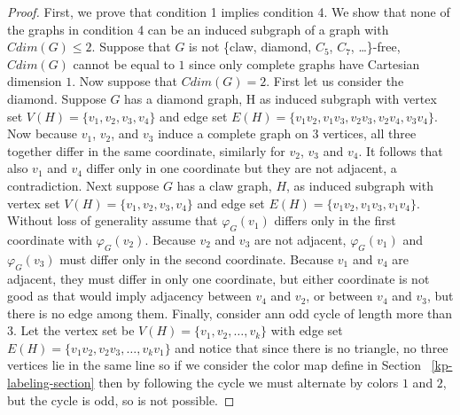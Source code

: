 \documentclass[12pt,a4paper,titlepage,openany]{report}
\begin{document}
\begin{proof}\sloppypar
First, we prove that condition 1 implies condition 4. We show that none of the graphs in condition 4 can be an induced subgraph of a graph with $Cdim(G)\leq 2$. Suppose that $G$ is not \{claw, diamond, $C_5$, $C_7$, \ldots\}-free, $Cdim(G)$ cannot be equal to $1$ since only complete graphs have Cartesian dimension $1$. Now suppose that $Cdim(G)=2$.
\newline First let us consider the diamond. Suppose $G$ has a diamond graph, H as induced subgraph with vertex set $V(H)=\{v_1,v_2,v_3,v_4\}$ and edge set $E(H)=\{v_1v_2,v_1v_3,v_2v_3,v_2v_4,v_3v_4\}$. Now because $v_1$, $v_2$, and $v_3$ induce a complete graph on $3$ vertices, all three together differ in the same coordinate, similarly for $v_2$, $v_3$ and $v_4$. It follows that also $v_1$ and $v_4$ differ only in one coordinate but they are not adjacent, a contradiction.
\newline Next suppose $G$ has a claw graph, $H$, as induced subgraph with vertex set $V(H)=\{v_1,v_2,v_3,v_4\}$ and edge set $E(H)=\{v_1v_2,v_1v_3,v_1v_4\}$. Without loss of generality assume that $\varphi_G(v_1)$ differs only in the first coordinate with $\varphi_G(v_2)$. Because $v_2$ and $v_3$ are not adjacent, $\varphi_G(v_1)$ and $\varphi_G(v_3)$ must differ only in the second coordinate. Because $v_1$ and $v_4$ are adjacent, they must differ in only one coordinate, but either coordinate is not good as that would  imply adjacency between $v_4$ and $v_2$, or between $v_4$ and $v_3$, but there is no edge among them.
\newline Finally, consider ann odd cycle of length more than 3. Let the vertex set be $V(H)=\{v_1,v_2,\ldots,v_k\}$ with edge set $E(H)=\{v_1v_2,v_2v_3,\ldots ,v_kv_1\}$ and notice that since there is no triangle, no three vertices lie in the same line so if we consider the color map define in Section ~\ref{kp-labeling-section} then by following the cycle we must alternate by colors $1$ and $2$, but the cycle is odd, so is not possible.\newline

\end{proof}
\end{document}
